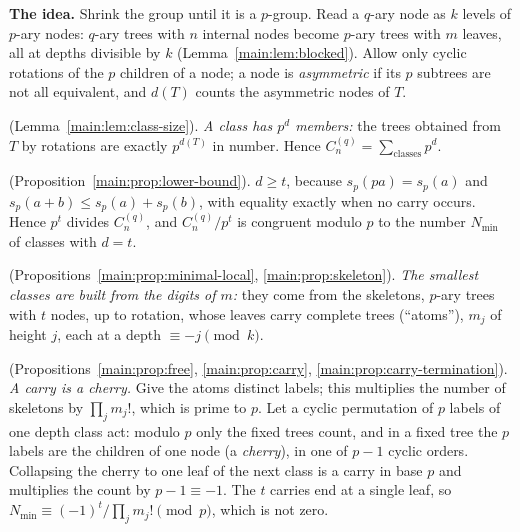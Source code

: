 \documentclass[11pt]{article}
\theoremstyle{definition}
\theoremstyle{remark}
\numberwithin{equation}{section}
\numberwithin{figure}{section}
\begin{document}
\noindent\textbf{The idea.} Shrink the group until it is a $p$-group. Read a $q$-ary node as $k$ levels of
$p$-ary nodes: $q$-ary trees with $n$ internal nodes become $p$-ary trees with $m$ leaves, all at depths
divisible by $k$ (Lemma~\ref{main:lem:blocked}). Allow only cyclic rotations of the $p$ children of a node; a
node is \emph{asymmetric} if its $p$ subtrees are not all equivalent, and $d(T)$ counts the asymmetric nodes
of $T$.
\begin{description}[leftmargin=1.2em,itemsep=0pt,topsep=2pt,parsep=0pt]
\item[Step 1] (Lemma~\ref{main:lem:class-size}). \emph{A class has $p^{d}$ members:} the trees obtained from
 $T$ by rotations are exactly $p^{d(T)}$ in number. Hence $C_n^{(q)}=\sum_{\text{classes}}p^{d}$.
\item[Step 2] (Proposition~\ref{main:prop:lower-bound}). \emph{$d\ge t$}, because $s_p(pa)=s_p(a)$ and
 $s_p(a+b)\le s_p(a)+s_p(b)$, with equality exactly when no carry occurs. Hence $p^t$ divides $C_n^{(q)}$, and
 $C_n^{(q)}/p^t$ is congruent modulo $p$ to the number $N_{\min}$ of classes with $d=t$.
\item[Step 3] (Propositions~\ref{main:prop:minimal-local}, \ref{main:prop:skeleton}). \emph{The smallest
 classes are built from the digits of $m$:} they come from the skeletons, $p$-ary trees with $t$ nodes, up to
 rotation, whose leaves carry complete trees (``atoms''), $m_j$ of height $j$, each at a depth
 $\equiv-j\pmod k$.
\item[Step 4] (Propositions~\ref{main:prop:free}, \ref{main:prop:carry}, \ref{main:prop:carry-termination}).
 \emph{A carry is a cherry.} Give the atoms distinct labels; this multiplies the number of skeletons by
 $\prod_jm_j!$, which is prime to $p$. Let a cyclic permutation of $p$ labels of one depth class act: modulo
 $p$ only the fixed trees count, and in a fixed tree the $p$ labels are the children of one node (a
 \emph{cherry}), in one of $p-1$ cyclic orders. Collapsing the cherry to one leaf of the next class is a carry
 in base $p$ and multiplies the count by $p-1\equiv-1$. The $t$ carries end at a single leaf, so
 $N_{\min}\equiv(-1)^t/\prod_jm_j!\pmod p$, which is not zero.
\end{description}
\end{document}
